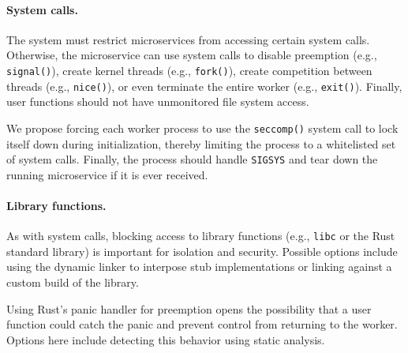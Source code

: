 
\paragraph{System calls.}
The system must restrict microservices from accessing certain system calls.
Otherwise, the microservice can use system calls to disable preemption
(e.g., \texttt{signal()}), create kernel threads (e.g., \texttt{fork()}),
create competition between threads (e.g., \texttt{nice()}), or even terminate
the entire worker (e.g., \texttt{exit()}). Finally, user functions should not
have unmonitored file system access.

We propose forcing each worker process to use the \texttt{seccomp()} system call
to lock itself down during initialization, thereby limiting the process to a
whitelisted set of system calls.  Finally, the process
should handle \texttt{SIGSYS} and tear down the running microservice if it is
ever received.

\paragraph{Library functions.}
As with system calls, blocking access to library functions (e.g., \texttt{libc}
or the Rust standard library) is important for isolation and security.  Possible
options include using the dynamic linker to interpose stub implementations or
linking against a custom build of the library.

Using Rust's panic handler for preemption opens the possibility that a user
function could catch the panic and prevent control from returning to the
worker. Options here include detecting this behavior using static analysis.

